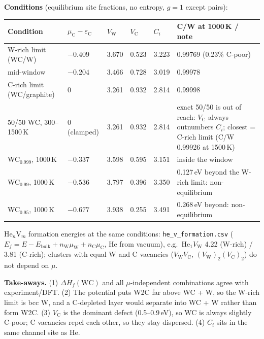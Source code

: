 \documentclass[10pt]{article}
\newcommand{\cmd}[1]{\texttt{\small #1}}
\begin{document}
\textbf{Conditions} (equilibrium site fractions, no entropy, $g=1$ except pairs):
\begin{xltabular}{\linewidth}{L{4.2cm} L{2.0cm} L{1.2cm} L{1.2cm} L{1.2cm} Y}
\toprule
\textbf{Condition} & $\mu_\mathrm C-\varepsilon_\mathrm C$ & $V_\mathrm W$ & $V_\mathrm C$ & $C_i$ & \textbf{C/W at 1000\,K / note} \\
\midrule\endhead
W-rich limit (WC/W) & $-0.409$ & 3.670 & 0.523 & 3.223 & 0.99769 (0.23\% C-poor) \\
mid-window & $-0.204$ & 3.466 & 0.728 & 3.019 & 0.99978 \\
C-rich limit (WC/graphite) & 0 & 3.261 & 0.932 & 2.814 & 0.99998 \\
50/50 WC, 300--1500\,K & 0 (clamped) & 3.261 & 0.932 & 2.814 & exact 50/50 is out of reach: $V_\mathrm C$ always outnumbers $C_i$; closest = C-rich limit (C/W 0.99926 at 1500\,K) \\
WC$_{0.999}$, 1000\,K & $-0.337$ & 3.598 & 0.595 & 3.151 & inside the window \\
WC$_{0.99}$, 1000\,K & $-0.536$ & 3.797 & 0.396 & 3.350 & 0.127\,eV beyond the W-rich limit: non-equilibrium \\
WC$_{0.95}$, 1000\,K & $-0.677$ & 3.938 & 0.255 & 3.491 & 0.268\,eV beyond: non-equilibrium \\
\bottomrule
\end{xltabular}
He$_n$V$_m$ formation energies at the same conditions: \cmd{he\_v\_formation.csv}
($E_f = E - E_\mathrm{bulk} + n_\mathrm W\mu_\mathrm W + n_\mathrm C\mu_\mathrm C$, He from vacuum), e.g.\ He$_1V_\mathrm W$ 4.22 (W-rich) / 3.81 (C-rich);
clusters with equal W and C vacancies ($V_\mathrm WV_\mathrm C$, $(V_\mathrm W)_2(V_\mathrm C)_2$) do not depend on $\mu$.

\textbf{Take-aways.} (1) $\Delta H_f(\mathrm{WC})$ and all $\mu$-independent combinations agree with experiment/DFT. (2) The potential puts W2C far above WC + W, so the W-rich limit is bcc W, and a C-depleted layer would separate into WC + W rather than form W2C. (3) $V_\mathrm C$ is the dominant defect (0.5--0.9\,eV), so WC is always slightly C-poor; C vacancies repel each other, so they stay dispersed. (4) $C_i$ sits in the same channel site as He.
\end{document}
